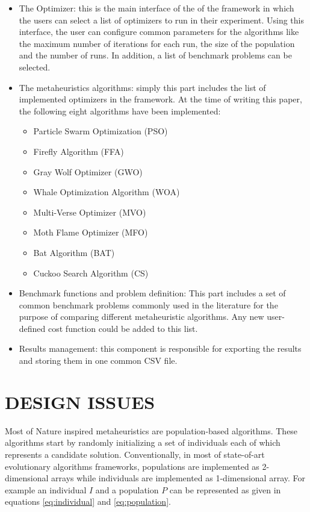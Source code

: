 \documentclass[a4paper,twoside]{article}
\begin{document}
\begin{itemize}
\item The Optimizer: this is the main interface of the of the framework in which the users can select a list of optimizers to run in their experiment. Using this interface, the user can configure common parameters for the algorithms like the maximum number of iterations for each run, the size of the population and the number of runs. In addition, a list of benchmark problems can be selected.

\item The metaheuristics algorithms: simply this part includes the list of implemented optimizers in the framework. At the time of writing this paper, the following eight algorithms have been implemented:

\begin{itemize}
\item Particle Swarm Optimization (PSO)
\item  Firefly Algorithm (FFA) \cite{Yang2010FFA} 
\item Gray Wolf Optimizer (GWO)\cite{Mirjalili201446}
\item Whale Optimization Algorithm (WOA) \cite{Mirjalili201651}
\item Multi-Verse Optimizer (MVO) \cite{Mirjalili2016}
\item Moth Flame Optimizer (MFO) \cite{Mirjalili2015228}
\item Bat Algorithm (BAT) \cite{Yang2010}
\item Cuckoo Search Algorithm (CS) \cite{Yang2009}
\end{itemize}



\item Benchmark functions and problem definition: This part includes a set of common benchmark problems commonly used in the literature for the purpose of comparing different metaheuristic algorithms. Any new user-defined cost function could be added to this list.

\item Results management: this component is responsible for exporting the results and storing them in one common CSV file. 
\end{itemize}


\section{\uppercase{Design issues}}

Most of Nature inspired metaheuristics are population-based algorithms. These algorithms start by randomly initializing a set of individuals each of which represents a candidate solution. Conventionally, in most of state-of-art evolutionary algorithms frameworks, populations are implemented as 2-dimensional arrays while individuals are implemented as 1-dimensional array. For example an individual $I$ and a population $P$ can be represented as given in equations \ref{eq:individual} and \ref{eq:population}.
\end{document}
